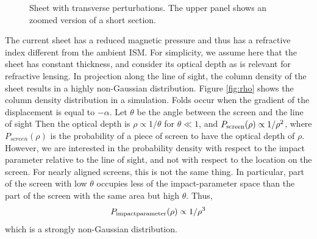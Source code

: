 \documentclass[useAMS,usenatbib]{mn2e}
\begin{document}
\begin{figure}
\vspace{-0.8in}
\centerline{}
\caption{Sheet with transverse perturbations.  The upper panel shows
  an zoomed version of a short section.}
\label{fig:sheet}
\end{figure}

The current sheet has a reduced magnetic pressure and thus has a refractive index different
from the ambient ISM. For simplicity, we assume here that the sheet has constant thickness, and
consider its optical depth as is relevant for refractive lensing.
In projection along the line of sight, the column density of the  sheet 
results in a highly non-Gaussian
distribution. Figure \ref{fig:rho} shows the column density distribution in a
simulation.  Folds occur when the gradient of the displacement is
equal to $-\alpha$.  
%
% 
Let $\theta$ be the angle between the screen and the line of sight
Then the optical depth is $\rho\propto1/\theta$ for
$\theta\ll 1$, and  $P_{\rm screen}(\rho)\propto 1/\rho^2$, where $P_{screen}(\rho)$
is the probability of a piece of screen to have the optical depth of $\rho$.
However, we are interested in the probability density with respect to the impact parameter relative
to the line of sight, and not with respect to the location on the screen. For nearly aligned screens, this
is not the same thing. In particular, part of the screen with low $\theta$ occupies less of the
impact-parameter space than the part of the screen with the same area but high $\theta$. Thus,
\begin{equation}
P_{\rm impact parameter}(\rho)\propto 1/\rho^3
\label{eqn:prho}
\end{equation}
which is a strongly non-Gaussian distribution.
\end{document}
